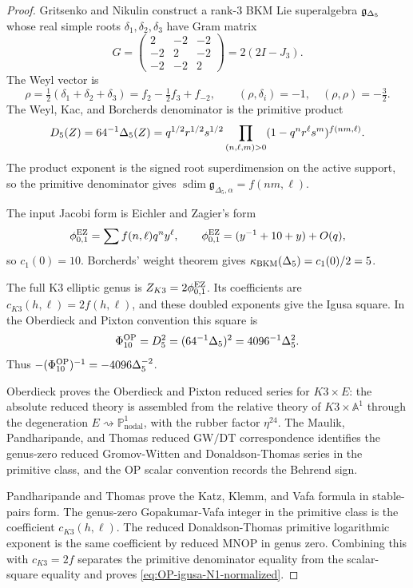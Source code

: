 \begin{proof}
Gritsenko and Nikulin construct a rank-$3$ BKM Lie superalgebra $\mathfrak{g}_{\Delta_5}$
whose real simple roots $\delta_1,\delta_2,\delta_3$ have Gram matrix
\[
  G=\begin{pmatrix}
  2&-2&-2\\
  -2&2&-2\\
  -2&-2&2
  \end{pmatrix}=2(2I-J_3).
\]
The Weyl vector is
\[
  \rho=\tfrac12(\delta_1+\delta_2+\delta_3)
       =f_2-\tfrac12 f_3+f_{-2},
  \qquad
  (\rho,\delta_i)=-1,\quad
  (\rho,\rho)=-\tfrac32.
\]
The Weyl, Kac, and Borcherds denominator is the primitive product
\[
  D_5(Z)=64^{-1}\Delta_5(Z)
  =
  q^{1/2}r^{1/2}s^{1/2}
  \prod_{(n,\ell,m)>0}(1-q^nr^\ell s^m)^{f(nm,\ell)}.
\]
The product exponent is the signed root superdimension on the active
support, so the primitive denominator gives
\(\operatorname{sdim}\mathfrak g_{\Delta_5,\alpha}=f(nm,\ell)\).

The input Jacobi form is Eichler and Zagier's form
\[
  \phi_{0,1}^{\mathrm{EZ}}=\sum f(n,\ell)q^ny^\ell,\qquad
  \phi_{0,1}^{\mathrm{EZ}}=(y^{-1}+10+y)+O(q),
\]
so $c_1(0)=10$.  Borcherds' weight theorem gives
$\kappa_{\mathrm{BKM}}(\Delta_5)=c_1(0)/2=5$.

The full K3 elliptic genus is \(Z_{K3}=2\phi_{0,1}^{\mathrm{EZ}}\). Its coefficients are
\(c_{K3}(h,\ell)=2f(h,\ell)\), and these doubled exponents give the
Igusa square. In the Oberdieck and Pixton convention this square is
\[
  \Phi_{10}^{\mathrm{OP}}=D_5^2=(64^{-1}\Delta_5)^2=4096^{-1}\Delta_5^2.
\]
Thus $-(\Phi_{10}^{\mathrm{OP}})^{-1}=-4096\Delta_5^{-2}$.

Oberdieck proves the Oberdieck and Pixton reduced series for $K3\times E$:
the absolute reduced theory is assembled from the relative theory of
$K3\times\mathbb A^1$ through the degeneration
$E\rightsquigarrow\mathbb P^1_{\mathrm{nodal}}$, with the rubber factor
$\eta^{24}$.  The Maulik, Pandharipande, and Thomas reduced
$\mathrm{GW}/\mathrm{DT}$ correspondence identifies the genus-zero
reduced Gromov-Witten and Donaldson-Thomas series in the primitive class,
and the OP scalar convention records the Behrend sign.

Pandharipande and Thomas prove the Katz, Klemm, and Vafa formula in
stable-pairs form. The genus-zero Gopakumar-Vafa integer in the
primitive class is the coefficient \(c_{K3}(h,\ell)\). The reduced
Donaldson-Thomas primitive logarithmic exponent is the same
coefficient by reduced MNOP in genus zero. Combining this with
\(c_{K3}=2f\) separates the primitive denominator equality from the
scalar-square equality and proves \eqref{eq:OP-igusa-N1-normalized}.
\end{proof}


